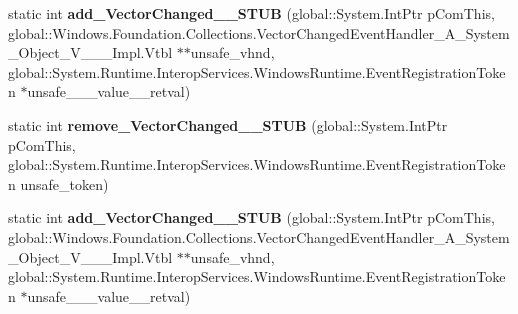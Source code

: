 \begin{DoxyCompactItemize}
\item 
\mbox{\label{struct_windows_1_1_foundation_1_1_collections_1_1_i_observable_vector___a___system___object___v_______impl_1_1_vtbl_a73603b0a65e801f868e563087158e9af}} 
static int {\bfseries add\+\_\+\+Vector\+Changed\+\_\+\+\_\+\+S\+T\+UB} (global\+::\+System.\+Int\+Ptr p\+Com\+This, global\+::\+Windows.\+Foundation.\+Collections.\+Vector\+Changed\+Event\+Handler\+\_\+\+A\+\_\+\+System\+\_\+\+Object\+\_\+\+V\+\_\+\+\_\+\+\_\+\+Impl.\+Vtbl $\ast$$\ast$unsafe\+\_\+vhnd, global\+::\+System.\+Runtime.\+Interop\+Services.\+Windows\+Runtime.\+Event\+Registration\+Token $\ast$unsafe\+\_\+\+\_\+\+\_\+value\+\_\+\+\_\+retval)
\item 
\mbox{\label{struct_windows_1_1_foundation_1_1_collections_1_1_i_observable_vector___a___system___object___v_______impl_1_1_vtbl_aabf887f0240da466ea88505e0d04bc08}} 
static int {\bfseries remove\+\_\+\+Vector\+Changed\+\_\+\+\_\+\+S\+T\+UB} (global\+::\+System.\+Int\+Ptr p\+Com\+This, global\+::\+System.\+Runtime.\+Interop\+Services.\+Windows\+Runtime.\+Event\+Registration\+Token unsafe\+\_\+token)
\item 
\mbox{\label{struct_windows_1_1_foundation_1_1_collections_1_1_i_observable_vector___a___system___object___v_______impl_1_1_vtbl_a73603b0a65e801f868e563087158e9af}} 
static int {\bfseries add\+\_\+\+Vector\+Changed\+\_\+\+\_\+\+S\+T\+UB} (global\+::\+System.\+Int\+Ptr p\+Com\+This, global\+::\+Windows.\+Foundation.\+Collections.\+Vector\+Changed\+Event\+Handler\+\_\+\+A\+\_\+\+System\+\_\+\+Object\+\_\+\+V\+\_\+\+\_\+\+\_\+\+Impl.\+Vtbl $\ast$$\ast$unsafe\+\_\+vhnd, global\+::\+System.\+Runtime.\+Interop\+Services.\+Windows\+Runtime.\+Event\+Registration\+Token $\ast$unsafe\+\_\+\+\_\+\+\_\+value\+\_\+\+\_\+retval)
\item 
\mbox{\label{struct_windows_1_1_foundation_1_1_collections_1_1_i_observable_vector___a___system___object___v_______impl_1_1_vtbl_aabf887f0240da466ea88505e0d04bc08}} 

\end{DoxyCompactItemize}
